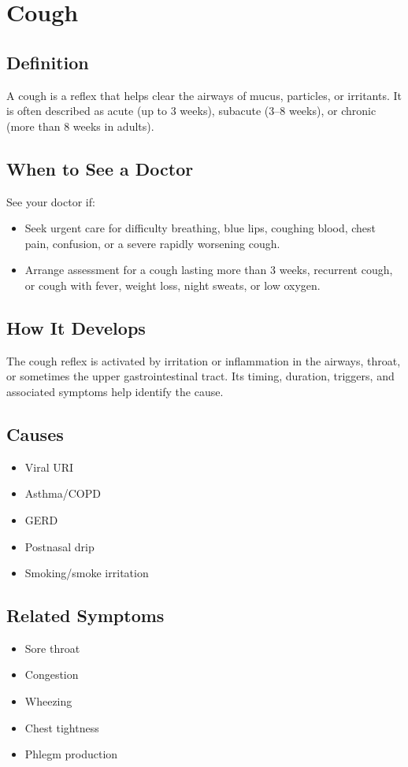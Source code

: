 \chapter{Cough}

\section*{Definition}
A cough is a reflex that helps clear the airways of mucus, particles, or irritants. It is often described as acute (up to 3 weeks), subacute (3--8 weeks), or chronic (more than 8 weeks in adults).

\section*{When to See a Doctor}
See your doctor if:
\begin{itemize}
  \item Seek urgent care for difficulty breathing, blue lips, coughing blood, chest pain, confusion, or a severe rapidly worsening cough.
  \item Arrange assessment for a cough lasting more than 3 weeks, recurrent cough, or cough with fever, weight loss, night sweats, or low oxygen.
\end{itemize}

\section*{How It Develops}
The cough reflex is activated by irritation or inflammation in the airways, throat, or sometimes the upper gastrointestinal tract. Its timing, duration, triggers, and associated symptoms help identify the cause.

\section*{Causes}
\begin{itemize}
  \item Viral URI
  \item Asthma/COPD
  \item GERD
  \item Postnasal drip
  \item Smoking/smoke irritation
\end{itemize}

\section*{Related Symptoms}
\begin{itemize}
  \item Sore throat
  \item Congestion
  \item Wheezing
  \item Chest tightness
  \item Phlegm production
\end{itemize}

